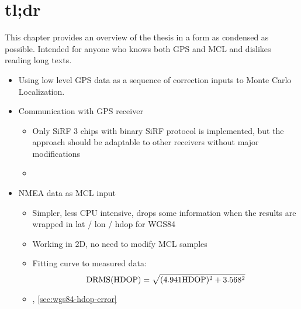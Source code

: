 \chapter{tl;dr}
This chapter provides an overview of the thesis in a form as condensed as possible.
Intended for anyone who knows both GPS and MCL and dislikes reading long texts.

\begin{itemize}
\item
Using low level GPS data as a sequence of correction inputs to Monte Carlo Localization.

\item
Communication with GPS receiver
\begin{itemize}
    \item Only SiRF 3 chips with binary SiRF protocol is implemented, but the
    approach should be adaptable to other receivers without major modifications
    \item {}
\end{itemize}

\item
NMEA data as MCL input
\begin{itemize}
    \item Simpler, less CPU intensive, drops some information when the results are
    wrapped in lat / lon / hdop for WGS84
    \item Working in 2D, no need to modify MCL samples
    \item
        Fitting curve to measured data:
        \begin{equation*}
            \mathrm{DRMS}(\mathrm{HDOP}) = \sqrt{(\num{4.941}\mathrm{HDOP})^2 + \num{3.568}^2}
        \end{equation*}
    \item {}, \cref{sec:wgs84-hdop-error}
\end{itemize}

\end{itemize}
